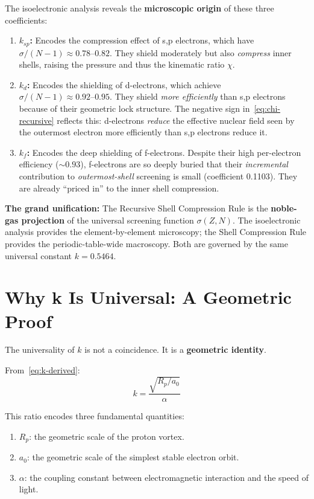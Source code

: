 The isoelectronic analysis reveals the \textbf{microscopic origin} of these three coefficients:

\begin{enumerate}
  \item \textbf{$k_{sp}$:} Encodes the compression effect of s,p electrons, which have $\sigma/(N{-}1) \approx 0.78\text{--}0.82$.  They shield moderately but also \emph{compress} inner shells, raising the pressure and thus the kinematic ratio $\chi$.
  \item \textbf{$k_d$:} Encodes the shielding of d-electrons, which achieve $\sigma/(N{-}1) \approx 0.92\text{--}0.95$.  They shield \emph{more efficiently} than s,p electrons because of their geometric lock structure.  The negative sign in~\eqref{eq:chi-recursive} reflects this: d-electrons \emph{reduce} the effective nuclear field seen by the outermost electron more efficiently than s,p electrons reduce it.
  \item \textbf{$k_f$:} Encodes the deep shielding of f-electrons.  Despite their high per-electron efficiency ($\sim 0.93$), f-electrons are so deeply buried that their \emph{incremental} contribution to \emph{outermost-shell} screening is small (coefficient 0.1103).  They are already ``priced in'' to the inner shell compression.
\end{enumerate}

\textbf{The grand unification:} The Recursive Shell Compression Rule is the \textbf{noble-gas projection} of the universal screening function $\sigma(Z, N)$.  The isoelectronic analysis provides the element-by-element microscopy; the Shell Compression Rule provides the periodic-table-wide macroscopy.  Both are governed by the same universal constant $k = 0.5464$.


\section{Why k Is Universal: A Geometric Proof}

The universality of $k$ is not a coincidence.  It is a \textbf{geometric identity}.

From~\eqref{eq:k-derived}:
\begin{equation}
  k = \frac{\sqrt{R_p / a_0}}{\alpha}
\end{equation}

This ratio encodes three fundamental quantities:
\begin{enumerate}
  \item $R_p$: the geometric scale of the proton vortex.
  \item $a_0$: the geometric scale of the simplest stable electron orbit.
  \item $\alpha$: the coupling constant between electromagnetic interaction and the speed of light.
\end{enumerate}

